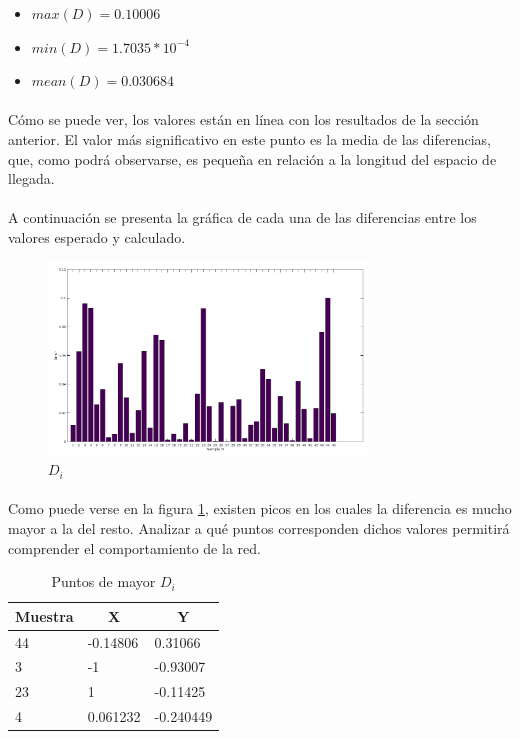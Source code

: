 \documentclass[12pt, twocolumn]{article}
\begin{document}
	\begin{itemize}
		\item $max(D) = 0.10006$
		\item $min(D) = 1.7035*10^{-4}$
		\item $mean(D) = 0.030684$
	\end{itemize}
	
	\paragraph{} Cómo se puede ver, los valores están en línea con los resultados de la sección anterior. El valor más significativo en este punto es la media de las diferencias, que, como podrá observarse, es pequeña en relación a la longitud del espacio de llegada. 
	
	\paragraph{} A continuación se presenta la gráfica de cada una de las diferencias entre los valores esperado y calculado.
	
	\begin{figure}[H]
		\centering
		\includegraphics[width=8.5cm]{../results/adaptive_eta_incremental/3/bar_incremental.png}
		\caption{$D_i$}
		\label{di1}
	\end{figure}
	
	\paragraph{} Como puede verse en la figura \ref{di1}, existen picos en los cuales la diferencia es mucho mayor a la del resto. Analizar a qué puntos corresponden dichos valores permitirá comprender el comportamiento de la red.
	
	\begin{table}[H]
		\centering
		\begin{tabular}{lll}
			\hline
			Muestra & \multicolumn{1}{c}{X} & \multicolumn{1}{c}{Y} \\ \hline
			44      & -0.14806              & 0.31066               \\
			3       & -1                    & -0.93007              \\
			23      & 1                     & -0.11425              \\
			4       & 0.061232              & -0.240449             \\ \hline
		\end{tabular}
		\caption{Puntos de mayor $D_{i}$}
		\label{p1}
	\end{table}
	
\end{document}
